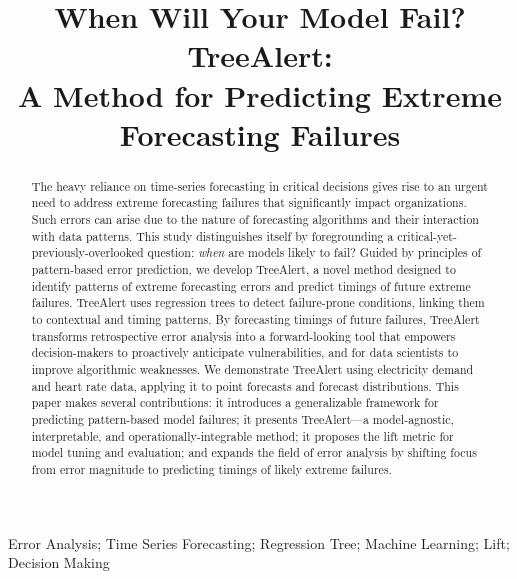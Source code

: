 \documentclass[]{interact}
\theoremstyle{plain}
\theoremstyle{definition}
\theoremstyle{remark}
\begin{document}

\title{When Will Your Model Fail? TreeAlert:\\
A Method for Predicting Extreme Forecasting Failures}

\author{
}

\maketitle

\begin{abstract}
The heavy reliance on time-series forecasting in critical decisions gives rise to an urgent
need to address extreme forecasting failures that significantly impact organizations. Such
errors can arise due to the nature of forecasting algorithms and their interaction with data
patterns. This study distinguishes itself by foregrounding a critical-yet-previously-overlooked
question: \emph{when} are models likely to fail? Guided by principles of pattern-based error
prediction, we develop TreeAlert, a novel method designed to identify patterns of extreme
forecasting errors and predict timings of future extreme failures. TreeAlert uses regression
trees to detect failure-prone conditions, linking them to contextual and timing patterns. By
forecasting timings of future failures, TreeAlert transforms retrospective error analysis into a
forward-looking tool that empowers decision-makers to proactively anticipate vulnerabilities,
and for data scientists to improve algorithmic weaknesses. We demonstrate TreeAlert using
electricity demand and heart rate data, applying it to point forecasts and forecast
distributions. This paper makes several contributions: it introduces a generalizable framework
for predicting pattern-based model failures; it presents TreeAlert---a model-agnostic,
interpretable, and operationally-integrable method; it proposes the lift metric for model
tuning and evaluation; and expands the field of error analysis by shifting focus from error
magnitude to predicting timings of likely extreme failures.
\end{abstract}

\begin{keywords}
Error Analysis; Time Series Forecasting; Regression Tree; Machine Learning; Lift; Decision Making
\end{keywords}
\end{document}
